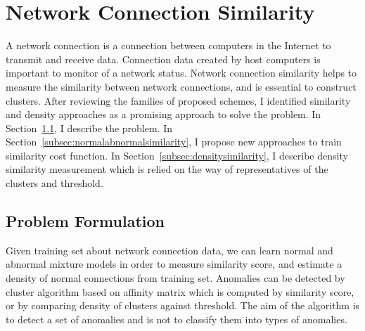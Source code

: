\section{Network Connection Similarity}
\label{sec:connectionsimilarity}
A network connection is a connection between computers in the Internet to transmit and receive data. 
Connection data created by host computers is important to monitor of a network status.
Network connection similarity helps to measure the similarity between network connections, and is essential to construct clusters. 
After reviewing the families of proposed schemes, I identified similarity and density approaches as a promising approach to solve the problem.
\newline
In Section~\ref{subsec:problemformulation}, I describe the problem.\newline
In Section~\ref{subsec:normalabnormalsimilarity}, I propose new approaches to train similarity cost function.\newline
In Section~\ref{subsec:densitysimilarity}, I describe density similarity measurement which is relied on the way of representatives of the clusters and threshold.\newline
\subsection{Problem Formulation}
\label{subsec:problemformulation}
Given training set about network connection data, we can learn normal and abnormal mixture models in order to measure similarity score, and estimate a density of normal connections from training set.
Anomalies can be detected by cluster algorithm based on affinity matrix which is computed by similarity score, or by comparing density of clusters against threshold. 
The aim of the algorithm is to detect a set of anomalies and is not to classify them into types of anomalies. 

